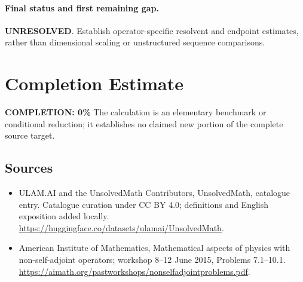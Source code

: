 \documentclass[11pt]{article}
\begin{document}
\paragraph{Final status and first remaining gap.}
\textbf{UNRESOLVED}. Establish operator-specific resolvent and endpoint estimates, rather than dimensional scaling or unstructured sequence comparisons.

\section{Completion Estimate}
\noindent\textbf{COMPLETION: 0\%}
The calculation is an elementary benchmark or conditional reduction; it establishes no claimed new portion of the complete source target.

\subsection{Sources}
\begin{itemize}
\item[\hypertarget{source:statement:1}{S1}] ULAM.AI and the UnsolvedMath Contributors, UnsolvedMath, catalogue entry. Catalogue curation under CC BY 4.0; definitions and English exposition added locally.
\url{https://huggingface.co/datasets/ulamai/UnsolvedMath}.
\item[\hypertarget{source:statement:2}{S2}] American Institute of Mathematics, Mathematical aspects of physics with non-self-adjoint operators; workshop 8–12 June 2015, Problems 7.1–10.1.
\url{https://aimath.org/pastworkshops/nonselfadjointproblems.pdf}.
\end{itemize}
\label{end:statement}
\end{document}
